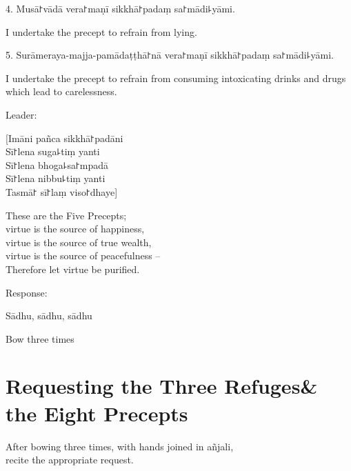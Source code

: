 4. Musā꜓vādā vera꜓maṇī sikkhā꜓padaṃ sa꜓mādi꜕yāmi.

\begin{english}
  I undertake the precept to refrain from lying.
\end{english}

5. Surāmeraya-majja-pamādaṭṭhā꜓nā vera꜓maṇī sikkhā꜓padaṃ sa꜓mādi꜕yāmi.

\begin{english}
  I undertake the precept to refrain from consuming intoxicating drinks and drugs which lead to carelessness.
\end{english}

\begin{instruction}
  Leader:
\end{instruction}

[Imāni pañca sikkhā꜓padāni\\
Sī꜓lena suga꜕tiṃ yanti\\
Sī꜓lena bhoga꜕sa꜓mpadā\\
Sī꜓lena nibbu꜕tiṃ yanti\\
Tasmā꜓ sī꜓laṃ viso꜓dhaye]

\begin{english}
  These are the Five Precepts;\\
  virtue is the source of happiness,\\
  virtue is the source of true wealth,\\
  virtue is the source of peacefulness --\\
  Therefore let virtue be purified.
\end{english}

\begin{instruction}
  Response:
\end{instruction}

Sādhu, sādhu, sādhu

\begin{instruction}
  Bow three times
\end{instruction}

\clearpage
\chapter[Three Refuges \& the Eight Precepts]{Requesting the Three Refuges\newline \& the Eight Precepts}

\begin{instruction}
  After bowing three times, with hands joined in añjali,\\
  recite the appropriate request.

\end{instruction}

